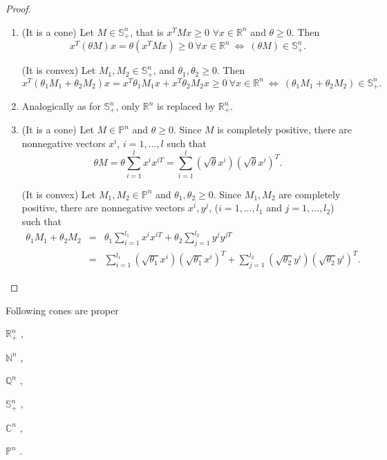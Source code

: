 \documentclass[12pt]{book}
\theoremstyle{definition}
\begin{document}
\begin{appendix}
\begin{proof}
\begin{enumerate}
\item (It is a cone) Let $M\in \mathbb{S}^n_+$, that is $x^TMx\geq 0$ $\forall x\in\mathbb{R}^n$ and $\theta \geq 0$. Then $$x^T(\theta M)x = \theta(x^TMx) \geq 0 \ \forall x\in\mathbb{R}^n \ \Leftrightarrow \ (\theta M) \in \mathbb{S}^n_+.$$

(It is convex)  Let $M_1, M_2\in \mathbb{S}^n_+$, and $\theta_1, \theta_2 \geq 0$. Then
$$x^T(\theta_1M_1 + \theta_2M_2)x = x^T\theta_1M_1x + x^T\theta_2M_2x \geq 0 \ \forall x\in\mathbb{R}^n \ \Leftrightarrow \ (\theta_1M_1 + \theta_2M_2) \in \mathbb{S}^n_+.$$

\item Analogically as for $\mathbb{S}^n_+$, only $\mathbb{R}^n$ is replaced by $\mathbb{R}^n_+$.

\item (It is a cone) Let $M\in \mathbb{P}^n$ and $\theta \geq 0$. Since $M$ is completely positive, there are nonnegative vectors $x^i$, $i = 1,\dots , l$ such that
$$ \theta M = \theta\sum_{i = 1}^l x^{i}x^{iT} = \sum_{i = 1}^l (\sqrt{\theta} x^{i})(\sqrt{\theta} x^{i})^T.$$

(It is convex) Let $M_1, M_2\in \mathbb{P}^n$ and $\theta_1, \theta_2 \geq 0$. Since $M_1, M_2$ are completely positive, there are nonnegative vectors $x^i, y^j$, ($i = 1,\dots , l_1$ and $j = 1,\dots ,l_2$)  such that
\begin{eqnarray*}
 \theta_1 M_1 + \theta_2 M_2 &=& \theta_1\sum_{i = 1}^{l_1} x^{i}x^{iT} + \theta_2\sum_{j = 1}^{l_2} y^{j}y^{jT} \\
 		& = & \sum_{i = 1}^{l_1} (\sqrt{\theta_1} x^{i})(\sqrt{\theta_1} x^{i})^T + \sum_{j = 1}^{l_2} (\sqrt{\theta_2} y^{i})(\sqrt{\theta_2} y^{i})^T .
\end{eqnarray*}
\end{enumerate}
\end{proof}

%


 Following cones are proper
\label{ExProperCones}

\begin{enumerate*}
\item $\mathbb{R}^n_+$ , \ \
\item $\mathbb{N}^n$ , \ \
\item $\mathbb{Q}^n$ , \ \
\item $\mathbb{S}^n_+$ , \ \ 
\item $\mathbb{C}^n$ , \ \ 
\item $\mathbb{P}^n$ . \ \ 
\end{enumerate*}


\end{appendix}
\end{document}
